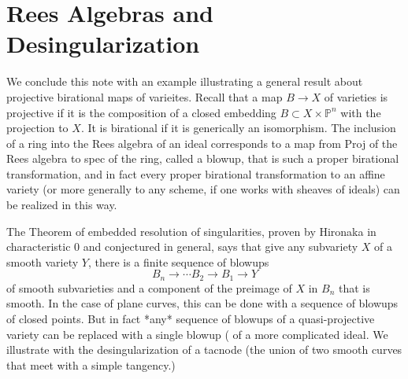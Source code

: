 \documentclass[twoside,12pt, leqno]{amsart}
\def\PP{{\mathbb P}}
\begin{document}
\section{Rees Algebras and Desingularization}

We conclude this note with an example illustrating a general result about projective birational maps of varieites.
Recall that a map $B\to X$ of varieties is projective if it is the composition of a closed embedding $B\subset X\times \PP^n$ with the projection to $X$.
It is birational if it is generically an isomorphism. The inclusion of a ring into the Rees algebra
of an ideal corresponds to a map from Proj of the Rees algebra to spec of the ring, called a blowup, that is such a proper birational transformation, and in fact every proper birational transformation to an affine variety (or more generally to any scheme, if one works with sheaves of ideals) can be realized in this way.

The Theorem of embedded resolution of singularities, proven by Hironaka in characteristic 0 and conjectured in general, says that give any subvariety $X$ of a smooth variety $Y$, there is
a finite sequence of blowups 
$$
B_n \to \cdots B_2 \to B_1 \to Y
$$
of smooth subvarieties  and a component of the preimage of
$X$ in $B_n$ that is smooth. In the case of plane curves, this can be done with a sequence of blowups of closed points. But in fact *any* sequence of blowups of a quasi-projective variety can be replaced with a single blowup (\cite[Theorem II.7.17]{Hartshorne} of a more complicated ideal. We illustrate with the desingularization of a tacnode (the union of two smooth curves that meet with a simple tangency.)
\end{document}
